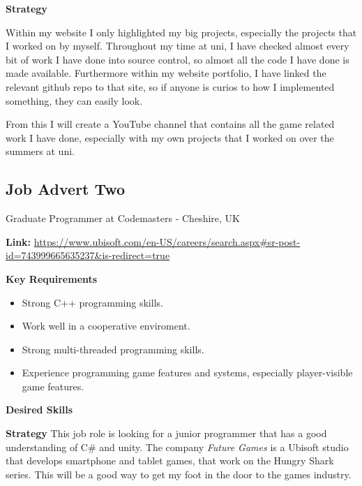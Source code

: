 \documentclass{scrartcl}
\begin{document}
\textbf{Strategy} %

Within my website I only highlighted my big projects, especially the projects that I worked on by myself.
Throughout my time at uni, I have checked almost every bit of work I have done into source control, so almost all the code I have done is made available. Furthermore within my website portfolio, I have linked the relevant github repo to that site, so if anyone is curios to how I implemented something, they can easily look.

From this I will create a YouTube channel that contains all the game related work I have done, especially with my own projects that I worked on over the summers at uni.








\subsection{Job Advert Two}
Graduate Programmer at Codemasters -  Cheshire, UK \cite{JobTwo}

\textbf{Link:} \url{https://www.ubisoft.com/en-US/careers/search.aspx#sr-post-id=743999665635237&is-redirect=true}

\textbf{Key Requirements}
\begin{itemize}
	\item Strong C++ programming skills.
	\item Work well in a cooperative enviroment.
	\item Strong multi-threaded programming skills.
	\item Experience programming game features and systems, especially player-visible game features.
\end{itemize}

\textbf{Desired Skills}


\textbf{Strategy}
This job role is looking for a junior programmer that has a good understanding of C\# and unity. 
The company \textit{Future Games} is a Ubisoft studio that develops smartphone and tablet games, that work on the Hungry Shark series.
This will be a good way to get my foot in the door to the games industry.
 
\end{document}
